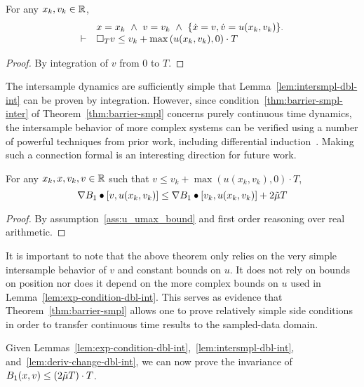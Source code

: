 \begin{lemma}
For any $x_k, v_k \in \mathbb{R}$,
\[
\begin{array}{cl}
& x = x_k~\wedge~v=v_k~\wedge~\{\dot{x}=v,\dot{v}=u(x_k,v_k)\}_{\cdot} \\
\vdash
& \Box{}_{T} v \leq v_k + \max{(u(x_k,v_k), 0)}\cdot T
\end{array}
\]
\label{lem:intersmpl-dbl-int}
\end{lemma}
\begin{proof}
By integration of $v$ from 0 to $T$.
\end{proof}

The intersample dynamics are sufficiently simple that
Lemma~\ref{lem:intersmpl-dbl-int} can be proven by integration. However,
since condition~\eqref{thm:barrier-smpl-inter} of
Theorem~\ref{thm:barrier-smpl} concerns purely continuous time dynamics,
the intersample behavior of more complex systems can be verified using a
number of powerful techniques from prior work, including differential
induction~\cite{Ghorbal14diffinv}. Making such a connection formal is an
interesting direction for future work.

\begin{lemma}
For any $x_k, x, v_k, v \in \mathbb{R}$ such that $v \leq v_k + \max{(u(x_k,v_k),
  0)}\cdot T$,
\[
\nabla B_1 \bullet [v,u(x_k,v_k)] \leq \nabla B_1 \bullet [v_k,u(x_k,v_k)] + 2\tilde{\mu} T
\]
\label{lem:deriv-change-dbl-int}
\end{lemma}
\begin{proof}
By assumption~\ref{ass:u_umax_bound} and first order reasoning over real
arithmetic.
\end{proof}

It is important to note that the above theorem only relies on the very
simple intersample behavior of $v$ and constant bounds on $u$. It does not
rely on bounds on position nor does it depend on the more complex bounds on
$u$ used in Lemma~\ref{lem:exp-condition-dbl-int}. This serves as evidence
that Theorem~\ref{thm:barrier-smpl} allows one to prove relatively simple
side conditions in order to transfer continuous time results to the
sampled-data domain.

Given Lemmas~\ref{lem:exp-condition-dbl-int},~\ref{lem:intersmpl-dbl-int},
and~\ref{lem:deriv-change-dbl-int}, we can now prove the invariance of
$B_1 (x,v) \leq (2\tilde{\mu} T) \cdot T$.

